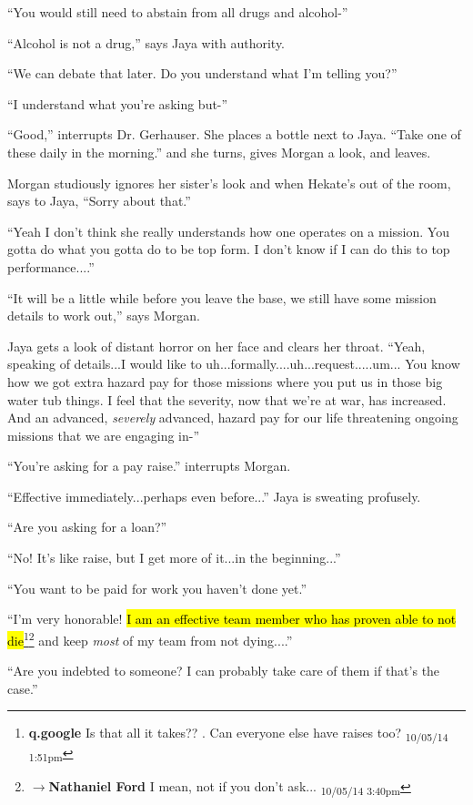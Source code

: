 ``You would still need to abstain from all drugs and alcohol-''

``Alcohol is not a drug,'' says Jaya with authority.

``We can debate that later.  Do you understand what I'm telling you?''

``I understand what you're asking but-''

``Good,'' interrupts Dr. Gerhauser.  She places a bottle next to Jaya.  ``Take one of these daily in the morning.''  and she turns, gives Morgan a look, and leaves.

Morgan studiously ignores her sister's look and when Hekate's out of the room, says to Jaya, ``Sorry about that.''

``Yeah I don't think she really understands how one operates on a mission.  You gotta do what you gotta do to be top form.  I don't know if I can do this to top performance....''

``It will be a little while before you leave the base, we still have some mission details to work out,'' says Morgan.

Jaya gets a look of distant horror on her face and clears her throat. ``Yeah, speaking of details...I would like to uh...formally....uh...request.....um... You know how we got extra hazard pay for those missions where you put us in those big water tub things.  I feel that the severity, now that we're at war, has increased.  And an advanced, \textit{severely} advanced, hazard pay for our life threatening ongoing missions that we are engaging in-''

``You're asking for a pay raise.'' interrupts Morgan.

``Effective immediately...perhaps even before...'' Jaya is sweating profusely.

``Are you asking for a loan?''

``No!  It's like raise, but I get more of it...in the beginning...''

``You want to be paid for work you haven't done yet.''

``I'm very honorable!  \hl{I am an effective team member who has proven able to not die}\footnote{\textbf{q.google }Is that all it takes??  .  Can everyone else have raises too? \textsubscript{10/05/14 1:51pm}}\footnote{$\rightarrow$\textbf{Nathaniel Ford }I mean, not if you don't ask... \textsubscript{10/05/14 3:40pm}} and keep \textit{most} of my team from not dying....''

``Are you indebted to someone?  I can probably take care of them if that's the case.''

